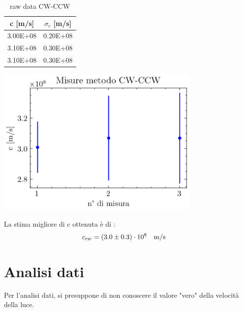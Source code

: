\documentclass[openright]{article}
\begin{document}
    \begin{table}[H]
    \centering
        \begin{minipage}{0.35\linewidth}
            
            \begin{tabular}{ c c }
                \toprule
                c [m/s] &  $\sigma_c$ [m/s] \\
                 
                \midrule
                3.00E+08 & 0.20E+08  \\
                3.10E+08 & 0.30E+08  \\ 
                3.10E+08 & 0.30E+08  \\
    
                \bottomrule           
            \end{tabular}
            \caption{raw data CW-CCW}
        \end{minipage}
        \begin{minipage}{0.6\linewidth}
            \centering
            \includegraphics[width=10cm]{../images/CW_CCW.png}
	    \end{minipage}
	\end{table}

    La stima migliore di c ottenuta è di :
    \[c_{cw} = (3.0	\pm 0.3) \cdot 10^8 \qq {m/s}\] 
    \newpage
    \section{Analisi dati}
    Per l'analisi dati, si presuppone di non conoscere il valore "vero" della velocità della luce. \\
    
\end{document}

